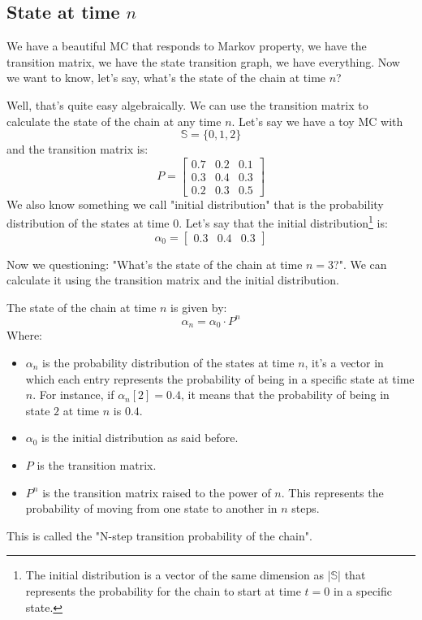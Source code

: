 \documentclass[a4paper]{article}
\begin{document}
\subsection{State at time $n$}
We have a beautiful MC that responds to Markov property, we have the transition matrix, we have the state transition graph, we have everything. Now we want to know, let's say, what's the state of the chain at time $n$?

Well, that's quite easy algebraically. We can use the transition matrix to calculate the state of the chain at any time $n$.
Let's say we have a toy MC with $$\mathbb{S} = \{0, 1, 2\}$$ and the transition matrix is: $$P = \begin{bmatrix} 0.7 & 0.2 & 0.1 \\ 0.3 & 0.4 & 0.3 \\ 0.2 & 0.3 & 0.5 \end{bmatrix}$$
We also know something we call "initial distribution" that is the probability distribution of the states at time $0$. Let's say that the initial distribution\footnote{The initial distribution is a vector of the same dimension as $|\mathbb{S}|$ that represents the probability for the chain to start at time $t = 0$ in a specific state.} is: $$\alpha_0 = \begin{bmatrix} 0.3 & 0.4 & 0.3 \end{bmatrix}$$

Now we questioning: "What's the state of the chain at time $n = 3$?".
We can calculate it using the transition matrix and the initial distribution. 

The state of the chain at time $n$ is given by:
$$\alpha_n = \alpha_0 \cdot P^n$$
Where: \begin{itemize}
    \item $\alpha_n$ is the probability distribution of the states at time $n$, it's a vector in which each entry represents the probability of being in a specific state at time $n$. For instance, if $\alpha_n[2] = 0.4$, it means that the probability of being in state $2$ at time $n$ is $0.4$. 
    \item $\alpha_0$ is the initial distribution as said before.
    \item $P$ is the transition matrix.
    \item $P^n$ is the transition matrix raised to the power of $n$. This represents the probability of moving from one state to another in $n$ steps.
\end{itemize}
This is called the "N-step transition probability of the chain".
\end{document}
